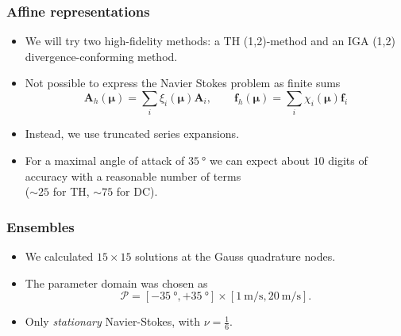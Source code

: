 \documentclass{beamer}
\begin{document}
\begin{frame}
  \frametitle{Affine representations}

  \begin{itemize}
  \item We will try two high-fidelity methods: a TH (1,2)-method and an IGA (1,2)
    divergence-conforming method.
  \item Not possible to express the Navier Stokes problem as finite sums
    \[
      \bm A_h(\bm \mu) = \textstyle \sum_i \xi_i(\bm \mu) \bm A_i, \qquad
      \bm f_h(\bm \mu) = \textstyle \sum_i \chi_i(\bm \mu) \bm f_i
    \]
  \item Instead, we use truncated series expansions.
  \item For a maximal angle of attack of $\SI{35}{\degree}$ we can expect about $10$ digits of
    accuracy with a reasonable number of terms \\ ($\sim 25$ for TH, $\sim 75$ for DC).
  \end{itemize}
\end{frame}

\begin{frame}
  \frametitle{Ensembles}

  \begin{itemize}
  \item We calculated $15 \times 15$ solutions at the Gauss quadrature nodes.
  \item The parameter domain was chosen as
    \[
      \mathcal{P} = [-\SI{35}{\degree}, +\SI{35}{\degree}] \times
      [\SI{1}{\meter/\second}, \SI{20}{\meter/\second}].
    \]
  \item Only \emph{stationary} Navier-Stokes, with $\nu = \frac{1}{6}$.
  \end{itemize}
\end{frame}
\end{document}
